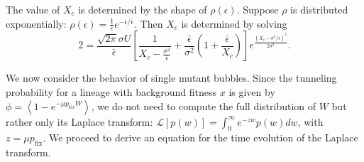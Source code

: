 \documentclass[rmp]{revtex4}
\begin{document}
The value of $X_c$ is determined by the shape of $\rho(\epsilon)$.
Suppose $\rho$ is distributed exponentially: $\rho(\epsilon) = \frac{1}{\bar{\epsilon}} e^{-\epsilon/\bar{\epsilon}}$.
Then $X_c$ is determined by solving
\begin{equation}
2 = \frac{\sqrt{2\pi}\sigma U}{\bar{\epsilon}} \left[ \frac{1}{X_c - \frac{\sigma^2}{\bar{\epsilon}}} + \frac{\bar{\epsilon}}{\sigma^2} \left( 1+ \frac{\bar{\epsilon}}{X_c} \right) \right] e^{\frac{(X_c - \sigma^2/\bar{\epsilon})^2}{2\sigma^2}}. 
\end{equation}

We now consider the behavior of single mutant bubbles.
Since the tunneling probability for a lineage with background fitness $x$ is given by $\phi = \left< 1 - e^{-\mu p_{\mathrm fix} W} \right>$, we do not need to compute the full distribution of $W$ but rather only its Laplace transform: $\mathcal{L}\left[ p(w) \right] = \int_0^\infty e^{-zw} p(w) dw$, with $z = \mu p_{\mathrm {fix}}$.
We proceed to derive an equation for the time evolution of the Laplace transform.
\end{document}
